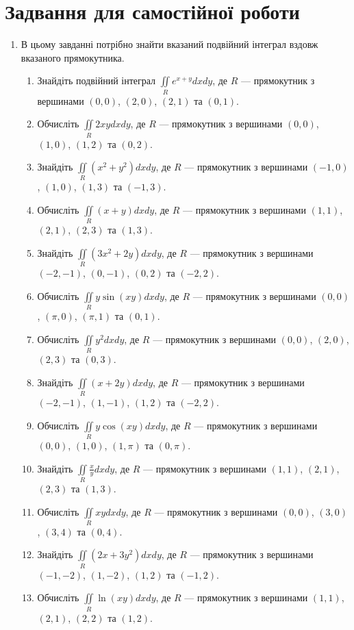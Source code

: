 \chapter{Задвання для самостійної роботи}
\begin{enumerate}
\item  В цьому завданні потрібно знайти вказаний подвійний інтеграл вздовж вказаного прямокутника.
\begin{enumerate}[label*=\arabic*.]
\item    Знайдіть подвійний інтеграл $\iint\limits_R e^{x+y}  dx  dy$, де $R$ --- прямокутник з вершинами $(0,0)$, $(2,0)$, $(2,1)$ та $(0,1)$.
\item     Обчисліть $\iint\limits_{R} 2xy  dx  dy$, де $R$ --- прямокутник з вершинами $(0, 0)$, $(1, 0)$, $(1, 2)$ та $(0, 2)$.
\item     Знайдіть $\iint\limits_{R} (x^2 + y^2)  dx  dy$, де $R$ --- прямокутник з вершинами $(-1, 0)$, $(1, 0)$, $(1, 3)$ та $(-1, 3)$.
\item     Обчисліть $\iint\limits_{R} (x + y)  dx  dy$, де $R$ --- прямокутник з вершинами $(1, 1)$, $(2, 1)$, $(2, 3)$ та $(1, 3)$.
\item     Знайдіть $\iint\limits_{R} (3x^2 + 2y)  dx  dy$, де $R$ --- прямокутник з вершинами $(-2, -1)$, $(0, -1)$, $(0, 2)$ та $(-2, 2)$.
\item     Обчисліть $\iint\limits_{R} y\sin(xy)  dx  dy$, де $R$ --- прямокутник з вершинами $(0, 0)$, $(\pi, 0)$, $(\pi, 1)$ та $(0, 1)$.
\item     Обчисліть $\iint\limits_{R} y^2  dx  dy$, де $R$ --- прямокутник з вершинами $(0, 0)$, $(2, 0)$, $(2, 3)$ та $(0, 3)$.
\item     Знайдіть $\iint\limits_{R} (x + 2y)  dx  dy$, де $R$ --- прямокутник з вершинами $(-2, -1)$, $(1, -1)$, $(1, 2)$ та $(-2, 2)$.
\item     Обчисліть $\iint\limits_{R} y\cos(xy)  dx  dy$, де $R$ --- прямокутник з вершинами $(0, 0)$, $(1, 0)$, $(1, \pi)$ та $(0, \pi)$.
\item     Знайдіть $\iint\limits_{R} \frac{x}{y}  dx  dy$, де $R$ --- прямокутник з вершинами $(1, 1)$, $(2, 1)$, $(2, 3)$ та $(1, 3)$.
\item     Обчисліть $\iint\limits_{R} xy  dx  dy$, де $R$ --- прямокутник з вершинами $(0, 0)$, $(3, 0)$, $(3, 4)$ та $(0, 4)$.
\item     Знайдіть $\iint\limits_{R} (2x + 3y^2)  dx  dy$, де $R$ --- прямокутник з вершинами $(-1, -2)$, $(1, -2)$, $(1, 2)$ та $(-1, 2)$.
\item     Обчисліть $\iint\limits_{R} \ln(xy)  dx  dy$, де $R$ --- прямокутник з вершинами $(1, 1)$, $(2, 1)$, $(2, 2)$ та $(1, 2)$.

\end{enumerate}
\end{enumerate}
